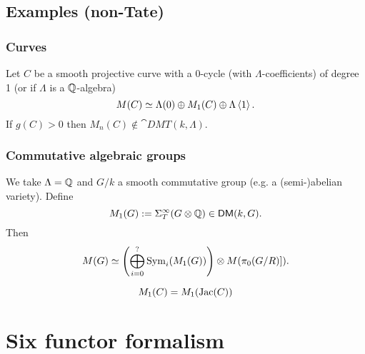 \subsection{Examples (non-Tate)}
\subsubsection{Curves}
\begin{proposition}
Let $C$ be a smooth projective curve with a 0-cycle (with $\Lambda$-coefficients) of
degree 1 (or if $\Lambda$ is a $\mathbb Q$-algebra)
\[
M(C) \simeq \Lambda(0) \oplus M_1(C) \oplus \Lambda \left<1 \right>.
\]
If $g(C)>0$ then $M_n(C)\not\in \cat{DMT}(k,\Lambda)$.
\end{proposition}
\subsubsection{Commutative algebraic groups}
\begin{theorem}[?]
We take $\Lambda=\mathbb Q$ and $G /k$ a smooth commutative group (e.g. a (semi-)abelian variety). Define
\[
M_1(G) := \Sigma_T^{\infty}(G\otimes \mathbb Q) \in \mathsf{DM}(k,G).
\]
Then
\[
M(G) \simeq \left( \bigoplus_{i=0}^{?}\operatorname{Sym}_i(M_1(G)) \right) \otimes M(\pi_0(G/R)]).
\]
\end{theorem}

\begin{example}
\[ M_1(C)=M_1(\operatorname{Jac}(C)) \]
\end{example}

\section{Six functor formalism}
